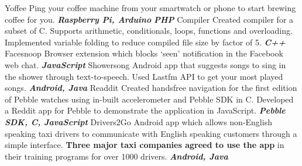 \begin{cvskills}
  \cvskill
    {Yoffee}
    {
	Ping your coffee machine from your smartwatch or phone to start brewing coffee for you.  \textit{\textbf{Raspberry Pi, Arduino}}
    }
\cvskill
{}
{
	\textit{\textbf{PHP}}
}
\cvskill
    {Compiler}
    { 
	Created compiler for a subset of C. Supports arithmetic, conditionals, loops,
}
\cvskill
{}
{
 functions and overloading. Implemented variable folding to reduce compiled file size by factor of 5. \textit{\textbf{C++}}
    }
  \cvskill
    {Facesnoop}
    {
        Browser extension which blocks ‘seen’ notification in the Facebook web chat. \textit{\textbf{JavaScript}}  
    }
\cvskill
    {Showersong}
    {
	Android app that suggests songs to sing in the shower through text-to-speech. Used Lastfm API to get your
}
\cvskill
{}
{
 most played songs. \textit{\textbf{Android, Java}}
    }
 \cvskill
    {Readdit}
    {
       Created handsfree navigation for the first edition of Pebble watches using in-built accelerometer and Pebble SDK
}
\cvskill
{}
{
 in C. Developed a Reddit app for Pebble to demonstrate the application in JavaScript. \textit{\textbf{Pebble SDK, C, JavaScript}}
    }
  \cvskill
    {Drivers2Go}
    { 
        Android app which allows non-English speaking taxi drivers to communicate with English speaking customers
}
\cvskill
{}
{
  through a simple interface. \textbf{Three major taxi companies agreed to use the app} in their training programs for over
    }
\cvskill
{}
{
1000 drivers.  \textit{\textbf{Android, Java}}      
}
\end{cvskills}
